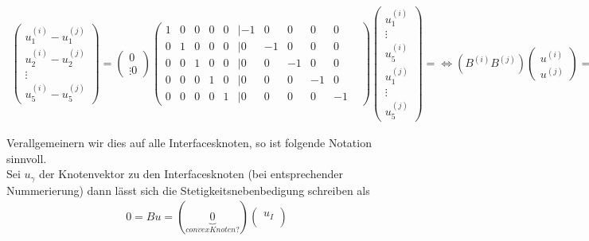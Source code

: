 \begin{enumerate}
\begin{align}
  \begin{pmatrix}
    u_1^{(i)}-u_1^{(j)}\\
    u_2^{(i)}-u_2^{(j)}\\
    \vdots\\
    u_5^{(i)}-u_5^{(j)}  
  \end{pmatrix}
  =
  \begin{pmatrix}
    0\\ \vdots 0
  \end{pmatrix}

  \begin{pmatrix}
    1& 0& 0& 0& 0& | -1& 0& 0& 0& 0&\\
    0& 1& 0& 0& 0& | 0& -1& 0& 0& 0&\\
    0& 0& 1& 0& 0& | 0& 0& -1& 0& 0&\\
    0& 0& 0& 1& 0& | 0& 0& 0& -1& 0&\\
    0& 0& 0& 0& 1& | 0& 0& 0& 0& -1&
  \end{pmatrix}
  \begin{pmatrix}
    u^{(i)}_1\\
    \vdots\\
    u^{(i)}_5\\
    u^{(j)}_1\\
    \vdots\\
    u^{(j)}_5
  \end{pmatrix}
  = 

  \Leftrightarrow
  
  (B^{(i)} B^{(j)}) %
  \begin{pmatrix}
    u^{(i)}\\
    u^{(j)}
  \end{pmatrix}
  =
  \begin{pmatrix}
    0\\
    0
  \end{pmatrix}

  \Leftrightarrow 

  Bu=0
\end{align}

Verallgemeinern wir dies auf alle Interfacesknoten, so ist folgende Notation sinnvoll. \\
Sei $u_\gamma$ der Knotenvektor zu den Interfacesknoten (bei entsprechender Nummerierung) dann lässt sich die Stetigkeitsnebenbedigung schreiben als 
\begin{align}
  0 = Bu = (\underbrace{0}_{convex Knoten?})
  \begin{pmatrix}
    u_I\\
    

\end{pmatrix}
\end{align}
\end{enumerate}

